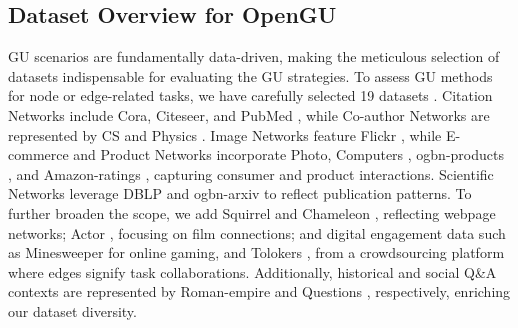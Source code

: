 \vspace{-1em}
\subsection{Dataset Overview for OpenGU}
\label{dataset}

GU scenarios are fundamentally data-driven, making the meticulous selection of datasets indispensable for evaluating the GU strategies. To assess GU methods for node or edge-related tasks, we have carefully selected 19 datasets \cite{kipf2016gcn}. Citation Networks include Cora, Citeseer, and PubMed \cite{Yang16cora}, while Co-author Networks are represented by CS and Physics \cite{shchur2018amazon_datasets}. Image Networks feature Flickr \cite{zeng2019graphsaint}, while E-commerce and Product Networks incorporate Photo, Computers \cite{shchur2018amazon_datasets}, ogbn-products \cite{hu2020ogb}, and Amazon-ratings \cite{platonov2023hete_gnn_survey4}, capturing consumer and product interactions. Scientific Networks leverage DBLP \cite{2019DBLP} and ogbn-arxiv \cite{hu2020ogb} to reflect publication patterns. To further broaden the scope, we add Squirrel and Chameleon \cite{pei2020geomgcn}, reflecting webpage networks; Actor \cite{pei2020geomgcn}, focusing on film connections; and digital engagement data such as Minesweeper \cite{platonov2023hete_gnn_survey4} for online gaming, and Tolokers \cite{platonov2023hete_gnn_survey4}, from a crowdsourcing platform where edges signify task collaborations. Additionally, historical and social Q\&A contexts are represented by Roman-empire and Questions \cite{platonov2023hete_gnn_survey4}, respectively, enriching our dataset diversity.

